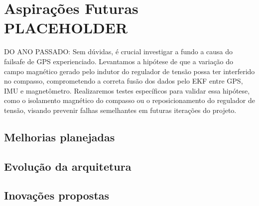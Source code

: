 \section{Aspirações Futuras PLACEHOLDER}

DO ANO PASSADO: Sem dúvidas, é crucial investigar a fundo a causa do failsafe de GPS experienciado. Levantamos a hipótese de que a variação do campo magnético gerado pelo indutor do regulador de tensão possa ter interferido no compasso, comprometendo a correta fusão dos dados pelo EKF entre GPS, IMU e magnetômetro. Realizaremos testes específicos para validar essa hipótese, como o isolamento magnético do compasso ou o reposicionamento do regulador de tensão, visando prevenir falhas semelhantes em futuras iterações do projeto.

\subsection{Melhorias planejadas}
\subsection{Evolução da arquitetura}
\subsection{Inovações propostas}
